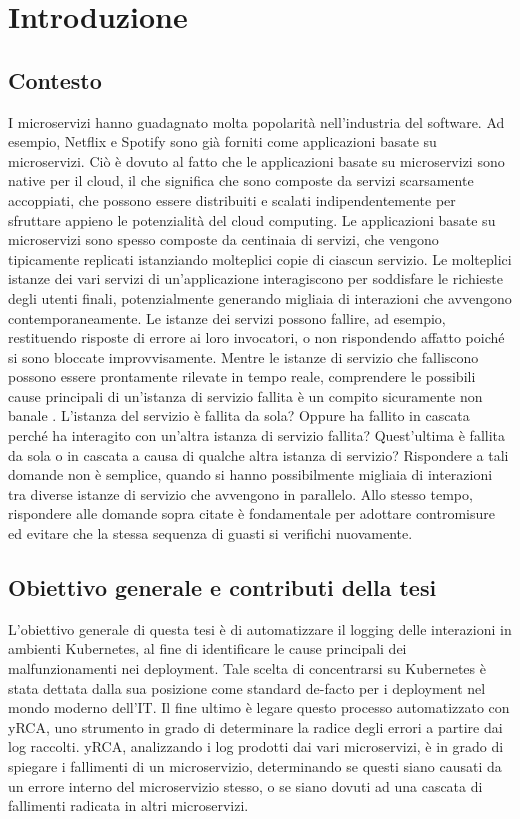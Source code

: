 \chapter{Introduzione}

\section{Contesto}

I microservizi hanno guadagnato molta popolarità nell'industria del software. Ad esempio, Netflix e Spotify sono già forniti come applicazioni basate su microservizi. Ciò è dovuto al fatto che le applicazioni basate su microservizi sono native per il cloud, il che significa che sono composte da servizi scarsamente accoppiati, che possono essere distribuiti e scalati indipendentemente per sfruttare appieno le potenzialità del cloud computing.
Le applicazioni basate su microservizi sono spesso composte da centinaia di servizi, che vengono tipicamente replicati istanziando molteplici copie di ciascun servizio. Le molteplici istanze dei vari servizi di un'applicazione interagiscono per soddisfare le richieste degli utenti finali, potenzialmente generando migliaia di interazioni che avvengono contemporaneamente. Le istanze dei servizi possono fallire, ad esempio, restituendo risposte di errore ai loro invocatori, o non rispondendo affatto poiché si sono bloccate improvvisamente.
Mentre le istanze di servizio che falliscono possono essere prontamente rilevate in tempo reale, comprendere le possibili cause principali di un'istanza di servizio fallita è un compito sicuramente non banale \cite{failure_root_cause_analysis}. L'istanza del servizio è fallita da sola? Oppure ha fallito in cascata perché ha interagito con un'altra istanza di servizio fallita? Quest'ultima è fallita da sola o in cascata a causa di qualche altra istanza di servizio? Rispondere a tali domande non è semplice, quando si hanno possibilmente migliaia di interazioni tra diverse istanze di servizio che avvengono in parallelo. Allo stesso tempo, rispondere alle domande sopra citate è fondamentale per adottare contromisure ed evitare che la stessa sequenza di guasti si verifichi nuovamente.

\section{Obiettivo generale e contributi della tesi}

L'obiettivo generale di questa tesi è di automatizzare il logging delle interazioni in ambienti Kubernetes, al fine di identificare le cause principali dei malfunzionamenti nei deployment. Tale scelta di concentrarsi su Kubernetes è stata dettata dalla sua posizione come standard de-facto per i deployment nel mondo moderno dell'IT. Il fine ultimo è legare questo processo automatizzato con yRCA\cite{yrca}, uno strumento in grado di determinare la radice degli errori a partire dai log raccolti. yRCA, analizzando i log prodotti dai vari microservizi, è in grado di spiegare i fallimenti di un microservizio, determinando se questi siano causati da un errore interno del microservizio stesso, o se siano dovuti ad una cascata di fallimenti radicata in altri microservizi.

